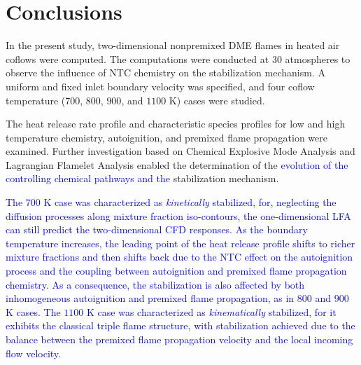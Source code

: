 \documentclass[review,3p,times]{elsarticle}
\begin{document}
\section{Conclusions}

In the present study, two-dimensional nonpremixed DME flames in heated air coflows were computed.  The computations were conducted at $30$ atmospheres to observe the influence of NTC chemistry on the stabilization mechanism.  A uniform and fixed inlet boundary velocity was specified, and four coflow temperature ($700$, $800$, $900$, and $1100$ K) cases were studied.  

The heat release rate profile and characteristic species profiles for low and high temperature chemistry, autoignition, and premixed flame propagation were examined.  Further investigation based on Chemical Explosive Mode Analysis and Lagrangian Flamelet Analysis enabled the determination of the \textcolor{blue}{evolution of the controlling chemical pathways and the }stabilization mechanism.  

\textcolor{blue}{The $700$ K case was characterized as \emph {kinetically} stabilized, for, neglecting the diffusion processes along mixture fraction iso-contours, the one-dimensional LFA can still predict the two-dimensional CFD responses.  As the boundary temperature increases, the leading point of the heat release profile shifts to richer mixture fractions and then shifts back due to the NTC effect on the autoignition process and the coupling between autoignition and premixed flame propagation chemistry.  As a consequence, the stabilization is also affected by both inhomogeneous autoignition and premixed flame propagation, as in $800$ and $900$ K cases.  The $1100$ K case was characterized as \emph {kinematically} stabilized, for it exhibits the classical triple flame structure, with stabilization achieved due to the balance between the premixed flame propagation velocity and the local incoming flow velocity.}


\end{document}
